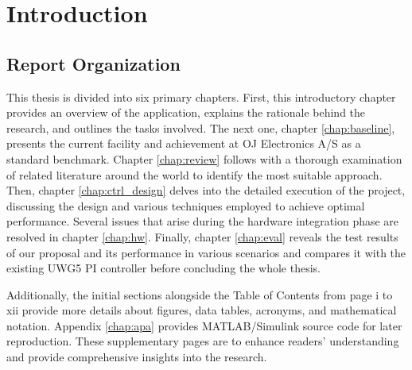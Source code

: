 \documentclass[../main.tex]{subfiles}
\begin{document}
\chapter{Introduction} \label{chap:intro}


\section{Report Organization}
This thesis is divided into six primary chapters. First, this introductory chapter provides an overview of the application, explains the rationale behind the research, and outlines the tasks involved. The next one, chapter \ref{chap:baseline}, presents the current facility and achievement at OJ Electronics A/S as a standard benchmark. Chapter \ref{chap:review} follows with a thorough examination of related literature around the world to identify the most suitable approach. Then, chapter \ref{chap:ctrl_design} delves into the detailed execution of the project, discussing the design and various techniques employed to achieve optimal performance. Several issues that arise during the hardware integration phase are resolved in chapter \ref{chap:hw}. Finally, chapter \ref{chap:eval} reveals the test results of our proposal and its performance in various scenarios and compares it with the existing UWG5 PI controller before concluding the whole thesis.

Additionally, the initial sections alongside the Table of Contents from page i to xii provide more details about figures, data tables, acronyms, and mathematical notation. Appendix \ref{chap:apa} provides MATLAB/Simulink source code for later reproduction. These supplementary pages are to enhance readers' understanding and provide comprehensive insights into the research.
\end{document}
